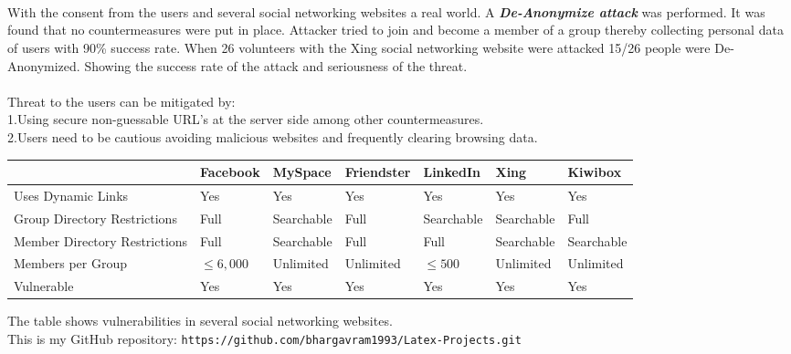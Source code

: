 \documentclass{article}
\begin{document}
\\
\\
\\
With the consent from the users and several social networking websites a real world. A \textbf{\textit{De-Anonymize attack}} was performed. It was found that no countermeasures were put in place. Attacker tried to join and become a member of a group thereby collecting personal data of users with 90\% success rate. When 26 volunteers with the Xing social networking website were attacked 15/26 people were De-Anonymized. Showing the success rate of the attack and seriousness of the threat.
\\
\\
Threat to the users can be mitigated by:
\\
1.Using secure non-guessable URL’s at the server side among other countermeasures.\\
2.Users need to be cautious avoiding malicious websites and frequently clearing browsing data.\\

\begin{center}
\begin{tabular}{|p{1.5cm}||p{1.5cm}|p{1.7cm}|p{1.5cm}|p{1.7cm}|p{1.7cm}|p{1.7cm}| }
\hline
& Facebook & MySpace & Friendster & LinkedIn & Xing & Kiwibox\\
\hline
Uses Dynamic Links&Yes&Yes&Yes&Yes&Yes&Yes\\
\hline
Group Directory Restrictions&Full&Searchable&Full&Searchable& Searchable&Full\\ 
\hline
Member Directory Restrictions&Full&Searchable&Full&Full&Searchable&Searchable\\
\hline
Members per Group & $\leq6,000$ & Unlimited & Unlimited & $\leq500$ & Unlimited & Unlimited\\
\hline
Vulnerable&Yes&Yes&Yes&Yes&Yes&Yes\\
\hline
\end{tabular}
\end{center}
The table shows vulnerabilities in several social networking websites.
\\
This is my GitHub repository: {\tt https://github.com/bhargavram1993/Latex-Projects.git }
\end{document}
